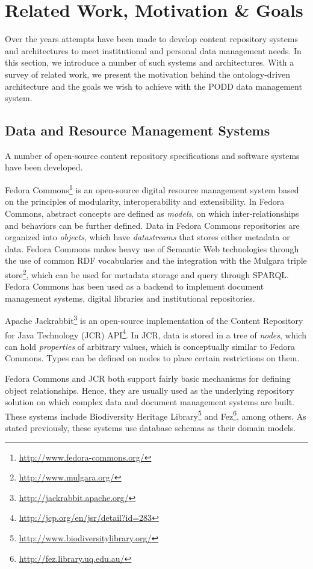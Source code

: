 \documentclass{elsarticle}
\begin{document}
\section{Related Work, Motivation \& Goals}\label{sec:overview}
Over the years attempts have been made to develop content repository
systems and architectures to meet institutional and personal
data management needs. In this section, we introduce a number of
such systems and architectures. With a survey of related work,
we present the motivation behind the ontology-driven architecture
and the goals we wish to achieve with the PODD data management system.

\subsection{Data and Resource Management Systems}
A number of open-source content repository specifications and
software systems have been developed.

Fedora Commons\footnote{\url{http://www.fedora-commons.org/}} is an open-source
digital resource management system based on the principles of modularity,
interoperability and extensibility. In Fedora Commons, abstract concepts are defined
as \emph{models}, on which inter-relationships and behaviors
can be further defined. Data in Fedora Commons repositories are
organized into \emph{objects}, which have \emph{datastreams} that stores
either metadata or data. Fedora Commons makes heavy use of Semantic Web
technologies through the use of common RDF vocabularies and the integration
with the Mulgara triple store\footnote{\url{http://www.mulgara.org/}},
which can be used for metadata storage and query through SPARQL.
Fedora Commons has been used as a backend to implement document
management systems, digital libraries and institutional repositories.

Apache Jackrabbit\footnote{\url{http://jackrabbit.apache.org/}} is an
open-source implementation of the Content Repository for Java Technology
(JCR) API\footnote{\url{http://jcp.org/en/jsr/detail?id=283}}. In JCR,
data is stored in a tree of \emph{nodes}, which can hold \emph{properties}
of arbitrary values, which is conceptually similar to Fedora Commons.
Types can be defined on nodes to place certain restrictions on them.

Fedora Commons and JCR both support fairly basic mechanisms for
defining object relationships. Hence, they are usually used as the
underlying repository solution on which complex data and document
management systems are built. These systems include Biodiversity
Heritage Library\footnote{\url{http://www.biodiversitylibrary.org/}}
and Fez\footnote{\url{http://fez.library.uq.edu.au/}}, among others.
As stated previously, these systems use database schemas as their
domain models.
\end{document}
